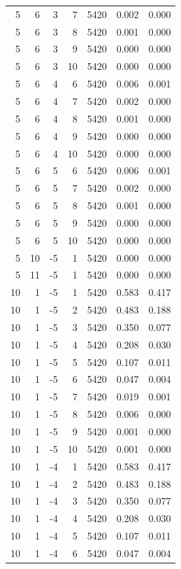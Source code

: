 \begin{table}
\begin{tabular}{rrrrrrr}
5 & 6 & 3 & 7 & 5420 & 0.002 & 0.000 \\
5 & 6 & 3 & 8 & 5420 & 0.001 & 0.000 \\
5 & 6 & 3 & 9 & 5420 & 0.000 & 0.000 \\
5 & 6 & 3 & 10 & 5420 & 0.000 & 0.000 \\
5 & 6 & 4 & 6 & 5420 & 0.006 & 0.001 \\
5 & 6 & 4 & 7 & 5420 & 0.002 & 0.000 \\
5 & 6 & 4 & 8 & 5420 & 0.001 & 0.000 \\
5 & 6 & 4 & 9 & 5420 & 0.000 & 0.000 \\
5 & 6 & 4 & 10 & 5420 & 0.000 & 0.000 \\
5 & 6 & 5 & 6 & 5420 & 0.006 & 0.001 \\
5 & 6 & 5 & 7 & 5420 & 0.002 & 0.000 \\
5 & 6 & 5 & 8 & 5420 & 0.001 & 0.000 \\
5 & 6 & 5 & 9 & 5420 & 0.000 & 0.000 \\
5 & 6 & 5 & 10 & 5420 & 0.000 & 0.000 \\
5 & 10 & -5 & 1 & 5420 & 0.000 & 0.000 \\
5 & 11 & -5 & 1 & 5420 & 0.000 & 0.000 \\
10 & 1 & -5 & 1 & 5420 & 0.583 & 0.417 \\
10 & 1 & -5 & 2 & 5420 & 0.483 & 0.188 \\
10 & 1 & -5 & 3 & 5420 & 0.350 & 0.077 \\
10 & 1 & -5 & 4 & 5420 & 0.208 & 0.030 \\
10 & 1 & -5 & 5 & 5420 & 0.107 & 0.011 \\
10 & 1 & -5 & 6 & 5420 & 0.047 & 0.004 \\
10 & 1 & -5 & 7 & 5420 & 0.019 & 0.001 \\
10 & 1 & -5 & 8 & 5420 & 0.006 & 0.000 \\
10 & 1 & -5 & 9 & 5420 & 0.001 & 0.000 \\
10 & 1 & -5 & 10 & 5420 & 0.001 & 0.000 \\
10 & 1 & -4 & 1 & 5420 & 0.583 & 0.417 \\
10 & 1 & -4 & 2 & 5420 & 0.483 & 0.188 \\
10 & 1 & -4 & 3 & 5420 & 0.350 & 0.077 \\
10 & 1 & -4 & 4 & 5420 & 0.208 & 0.030 \\
10 & 1 & -4 & 5 & 5420 & 0.107 & 0.011 \\
10 & 1 & -4 & 6 & 5420 & 0.047 & 0.004 \\

\end{tabular}
\end{table}
